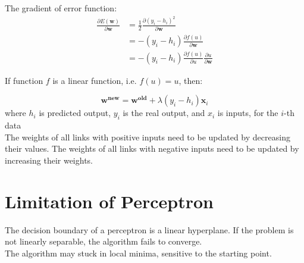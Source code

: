 \begin{multicols*}{2}
\noindent The gradient of error function:
\begin{equation*}
\begin{split}
\frac{\partial E(\mathbf{w})}{\partial \mathbf{w}} &= \frac{1}{2} \frac{\partial (y_i-h_i)^{2}}{\partial \mathbf{w}} \\
&= - (y_i-h_i) \frac{\partial f(u)}{\partial \mathbf{w}} \\
&= - (y_i-h_i) \frac{\partial f(u)}{\partial u} \frac{\partial u}{\partial \mathbf{w}}
\end{split}
\end{equation*}

\noindent If function $f$ is a linear function, i.e. $f(u) = u$, then:

$$\mathbf{w^{new}} = \mathbf{w^{old}} + \lambda (y_i - h_i) \mathbf{x}_i$$
\noindent where $h_i$ is predicted output, $y_i$ is the real output, and $x_i$ is inputs, for the $i$-th data \\

\noindent The weights of all links with positive inputs need to be updated by decreasing their values. The weights of all links with negative inputs need to be updated by increasing their weights.

\section{Limitation of Perceptron}

\noindent The decision boundary of a perceptron is a linear hyperplane. If the problem is not linearly separable, the algorithm fails to converge. \\

\noindent The algorithm may stuck in local minima, sensitive to the starting point.


\end{multicols*}
